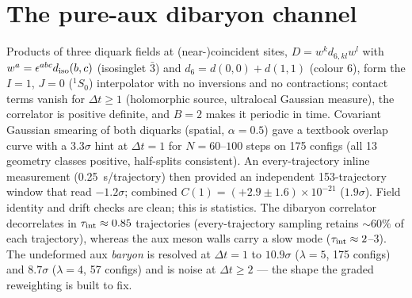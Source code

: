 \documentclass[11pt]{article}
\begin{document}
\section{The pure-aux dibaryon channel}
Products of three diquark fields at (near-)coincident sites,
$D=w^k d_{6,kl}w^l$ with $w^a=\epsilon^{abc}d_{\rm iso}(b,c)$ (isosinglet $\bar3$) and
$d_6=d(0,0)+d(1,1)$ (colour 6), form the $I=1$, $J=0$ ($^1S_0$) interpolator with no inversions
and no contractions; contact terms vanish for $\Delta t\ge1$ (holomorphic source, ultralocal
Gaussian measure), the correlator is positive definite, and $B=2$ makes it periodic in time.
Covariant Gaussian smearing of both diquarks (spatial, $\alpha=0.5$) gave a textbook overlap
curve with a $3.3\sigma$ hint at $\Delta t=1$ for $N=60$--$100$ steps on 175 configs
(all 13 geometry classes positive, half-splits consistent).  An every-trajectory inline
measurement (0.25~s/trajectory) then provided an independent 153-trajectory window that read
$-1.2\sigma$; combined $C(1)=(+2.9\pm1.6)\times10^{-21}$ ($1.9\sigma$).  Field identity and
drift checks are clean; this is statistics.  The dibaryon correlator decorrelates in
$\tau_{\rm int}\approx0.85$ trajectories (every-trajectory sampling retains $\sim60\%$ of each
trajectory), whereas the aux meson walls carry a slow mode ($\tau_{\rm int}\approx2$--$3$).
The undeformed aux \emph{baryon} is resolved at $\Delta t=1$ to $10.9\sigma$ ($\lambda=5$,
175 configs) and $8.7\sigma$ ($\lambda=4$, 57 configs) and is noise at $\Delta t\ge2$ --- the
shape the graded reweighting is built to fix.
\end{document}
